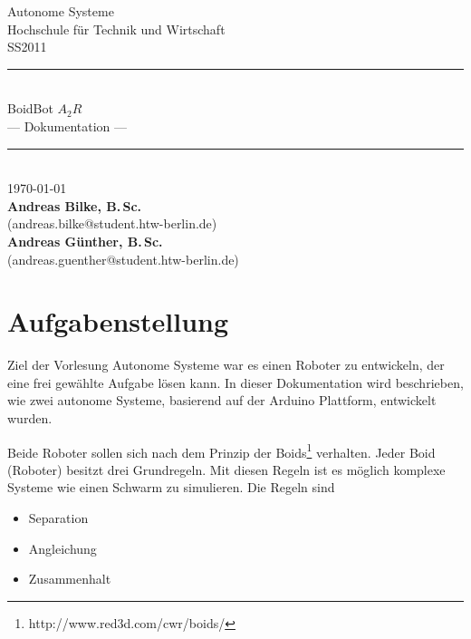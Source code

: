 \documentclass[12pt,a4paper,titlepage]{article}
\begin{document}
\begin{titlepage}
\begin{center}

{\large Autonome Systeme\\[0.1cm]
Hochschule für Technik und Wirtschaft\\[0.1cm]
SS2011}\\[1.5cm]
\rule{\linewidth}{0.3mm}\\[1.5cm]
{\huge BoidBot $A_{2}R$}\\[1cm]
{\LARGE --- Dokumentation ---}\\[1.5cm]
\rule{\linewidth}{0.3mm}\\[1.5cm]
{\large \today}\\[1cm]
\textbf{Andreas Bilke, B.\,Sc.}\\(andreas.bilke@student.htw-berlin.de)\\[0.3cm]
\textbf{Andreas Günther, B.\,Sc.}\\(andreas.guenther@student.htw-berlin.de)\\[3cm]
\end{center}
\end{titlepage}
\newpage

\tableofcontents
\newpage
{}


\section{Aufgabenstellung}

Ziel der Vorlesung Autonome Systeme war es einen Roboter zu entwickeln, der eine frei gewählte Aufgabe lösen kann. In dieser Dokumentation wird beschrieben, wie zwei autonome Systeme, basierend auf der Arduino Plattform, entwickelt wurden.

Beide Roboter sollen sich nach dem Prinzip der Boids\footnote{http://www.red3d.com/cwr/boids/} verhalten. Jeder Boid (Roboter) besitzt drei Grundregeln. Mit diesen Regeln ist es möglich komplexe Systeme wie einen Schwarm zu simulieren. Die Regeln sind

\begin{itemize}
    \item Separation
    \item Angleichung
    \item Zusammenhalt
\end{itemize}
\end{document}
